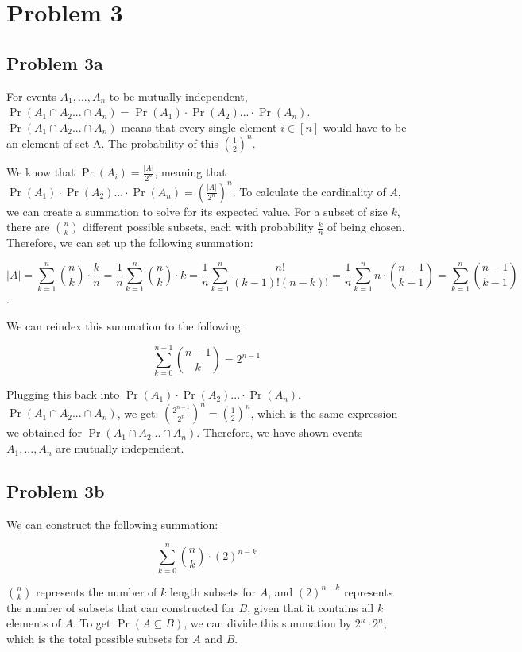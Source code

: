 \documentclass{article}
\begin{document}
\section{Problem 3}

\subsection{Problem 3a}

For events $A_1, ..., A_n$ to be mutually independent, $\Pr(A_1 \cap A_2 ... \cap A_n) = \Pr(A_1) \cdot \Pr(A_2) ... \cdot \Pr(A_n)$. $\Pr(A_1 \cap A_2 ... \cap A_n)$ means that every single element $i \in [n]$ would have to be an element of set A. The probability of this $(\frac{1}{2})^n$. 

\noindent We know that $\Pr(A_i) = \frac{|A|}{2^n}$, meaning that $\Pr(A_1) \cdot \Pr(A_2) ... \cdot \Pr(A_n) = \left(\frac{|A|}{2^n}\right)^n$. To calculate the cardinality of $A$, we can create a summation to solve for its expected value. For a subset of size $k$, there are $\binom{n}{k}$ different possible subsets, each with probability $\frac{k}{n}$ of being chosen. Therefore, we can set up the following summation: 

$$|A| = \sum_{k = 1}^{n} \binom{n}{k} \cdot \frac{k}{n} = \frac{1}{n} \sum_{k = 1}^{n} \binom{n}{k} \cdot k = \frac{1}{n} \sum_{k = 1}^{n} \frac{n!}{(k - 1)!(n - k)!} = \frac{1}{n} \sum_{k = 1}^{n} n \cdot \binom{n - 1}{k - 1} = \sum_{k = 1}^{n} \binom{n - 1}{k - 1}$$.

\noindent We can reindex this summation to the following:

$$\sum_{k = 0}^{n - 1} \binom{n - 1}{k}  = 2^{n - 1}$$

\noindent Plugging this back into $\Pr(A_1) \cdot \Pr(A_2) ... \cdot \Pr(A_n)$. $\Pr(A_1 \cap A_2 ... \cap A_n)$, we get: $\left(\frac{2^{n-1}}{2^n}\right)^n = \left(\frac{1}{2}\right)^n$, which is the same expression we obtained for $\Pr(A_1 \cap A_2 ... \cap A_n)$. Therefore, we have shown events $A_1, ..., A_n$ are mutually independent.

\subsection{Problem 3b}

We can construct the following summation:

$$\sum_{k = 0}^{n} \binom{n}{k} \cdot (2)^{n - k}$$

\noindent $\binom{n}{k}$ represents the number of $k$ length subsets for $A$, and $(2)^{n - k}$ represents the number of subsets that can constructed for $B$, given that it contains all $k$ elements of $A$. To get $\Pr(A  \subseteq B)$, we can divide this summation by $2^n \cdot 2^n$, which is the total possible subsets for $A$ and $B$.
\end{document}
